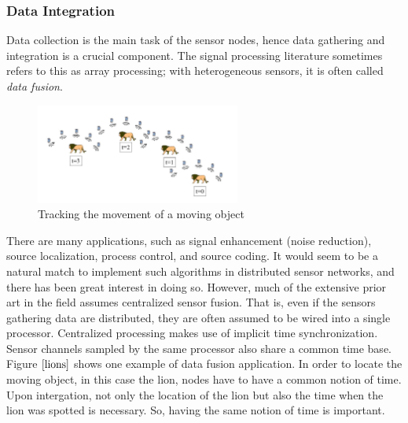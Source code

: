 \documentclass[a4paper,10pt]{report}
\begin{document}
\subsubsection{Data Integration}
Data collection is the main task of the sensor nodes, hence data gathering and integration is a crucial component.
The signal processing literature sometimes refers to this as array processing; with heterogeneous sensors, it is often called \textit{data fusion}.
\begin{figure}
\centering
\includegraphics[width= 0.6\textwidth]{lions}
\caption{Tracking the movement of a moving object}
\label{lions}
\end{figure}
\newline
There are many applications, such as signal enhancement (noise reduction), source localization, process control, and source coding.
It would seem to be a natural match to implement such algorithms in distributed sensor networks, and there has been great interest in
doing so. However, much of the extensive prior art in the field assumes centralized sensor fusion. That is, even if the sensors
gathering data are distributed, they are often assumed to be wired into a single processor. Centralized processing makes use of
implicit time synchronization. Sensor channels sampled by the same processor also share a common time base. Figure $\ref{lions}$ shows 
one example of data fusion application. In order to locate the moving object, in this case the lion, nodes have to have a common
notion of time. Upon intergation, not only the location of the lion but also the time when the lion was spotted is necessary. So, having the same notion of time is important.
\end{document}
